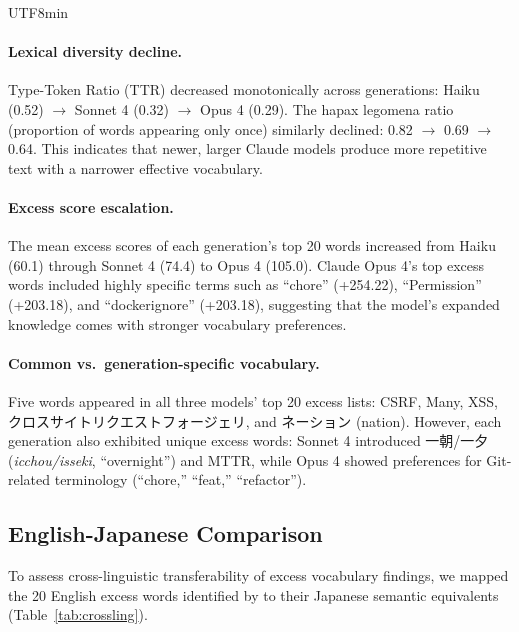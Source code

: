 \documentclass[11pt,a4paper]{article}
\begin{document}
\begin{CJK}{UTF8}{min}
\paragraph{Lexical diversity decline.}
Type-Token Ratio (TTR) decreased monotonically across generations: Haiku (0.52) $\to$ Sonnet 4 (0.32) $\to$ Opus 4 (0.29). The hapax legomena ratio (proportion of words appearing only once) similarly declined: 0.82 $\to$ 0.69 $\to$ 0.64. This indicates that newer, larger Claude models produce more repetitive text with a narrower effective vocabulary.

\paragraph{Excess score escalation.}
The mean excess scores of each generation's top 20 words increased from Haiku (60.1) through Sonnet 4 (74.4) to Opus 4 (105.0). Claude Opus 4's top excess words included highly specific terms such as ``chore'' (+254.22), ``Permission'' (+203.18), and ``dockerignore'' (+203.18), suggesting that the model's expanded knowledge comes with stronger vocabulary preferences.

\paragraph{Common vs.\ generation-specific vocabulary.}
Five words appeared in all three models' top 20 excess lists: CSRF, Many, XSS, クロスサイトリクエストフォージェリ, and ネーション (nation). However, each generation also exhibited unique excess words: Sonnet 4 introduced 一朝/一夕 (\textit{icchou/isseki}, ``overnight'') and MTTR, while Opus 4 showed preferences for Git-related terminology (``chore,'' ``feat,'' ``refactor'').

\subsection{English-Japanese Comparison}

To assess cross-linguistic transferability of excess vocabulary findings, we mapped the 20 English excess words identified by \citet{kobak2024vocabulary} to their Japanese semantic equivalents (Table~\ref{tab:crossling}).


\end{CJK}
\end{document}
